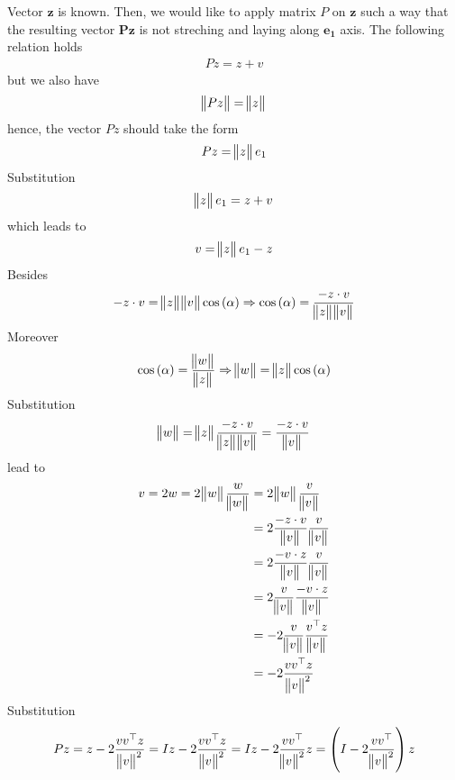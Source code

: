 \documentclass[12pt]{article}
\begin{document}
Vector $\bm{z}$ is known. 
Then, we would like to apply matrix $P$ on $\bm{z}$ such a way that 
the resulting vector $\bm{Pz}$ is not streching and laying along $\bm{e_1}$ axis.
The following relation holds
\begin{align}
	Pz = z + v
\end{align}
but we also have
\begin{align}
	\norm[1]{Pz} = \norm[1]{z}
\end{align}
hence, the vector $Pz$ should take the form
\begin{align}
	Pz = \norm[1]{z} e_{1}
\end{align}
Substitution
\begin{align}
	\norm[1]{z} e_{1} = z + v
\end{align}
which leads to 
\begin{align}
	v = \norm[1]{z} e_{1} - z
\end{align}
Besides
\begin{align}
	-z \cdot v = \norm[1]{z}\norm[1]{v}\cos{(\alpha)}
	\Rightarrow 
	\cos{(\alpha)} = \frac{-z \cdot v}{\norm[1]{z}\norm[1]{v}}
\end{align}
Moreover
\begin{align}
	\cos{(\alpha)} = \frac{\norm[1]{w}}{\norm[1]{z}}
	\Rightarrow
	\norm[1]{w} = \norm[1]{z} \cos{(\alpha)}
\end{align}
Substitution
\begin{align}
	\norm[1]{w}
	= \norm[1]{z} \frac{-z \cdot v}{\norm[1]{z}\norm[1]{v}}
	= \frac{-z \cdot v}{\norm[1]{v}}
\end{align}
lead to 
\begin{align}
	v 
	= 2w 
	= 2 \norm[1]{w} \frac{w}{\norm[1]{w}}
	 & = 2 \norm[1]{w} \frac{v}{\norm[1]{v}}                     \\
	 & = 2 \frac{-z \cdot v}{\norm[1]{v}} \frac{v}{\norm[1]{v}}  \\ 
	 & = 2 \frac{-v \cdot z}{\norm[1]{v}} \frac{v}{\norm[1]{v}}  \\
	 & = 2 \frac{v}{\norm[1]{v}} \frac{-v \cdot z}{\norm[1]{v}}  \\
	 & = -2 \frac{v}{\norm[1]{v}} \frac{v^{\top} z}{\norm[1]{v}} \\
	 & = -2 \frac{vv^{\top} z}{\norm[1]{v}^2}
\end{align}
Substitution
\begin{align}
	Pz = z -2 \frac{vv^{\top} z}{\norm[1]{v}^2}
	= Iz -2 \frac{vv^{\top} z}{\norm[1]{v}^2}
	= Iz -2 \frac{vv^{\top}}{\norm[1]{v}^2}z
	= \left( I -2 \frac{vv^{\top}}{\norm[1]{v}^2} \right)z
\end{align}
\end{document}
